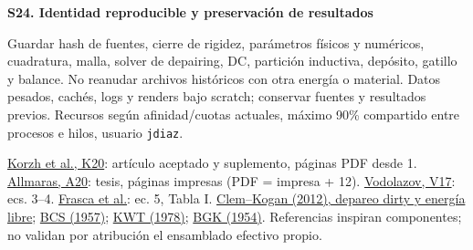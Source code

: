 \documentclass[11pt,a4paper]{article}
\newcommand{\block}[1]{\par\vspace{6pt}{\large\bfseries\color{ink}#1}\par\vspace{3pt}}
\newcommand{\assumption}[2]{\par\vspace{6pt}\hypertarget{#1}{\textbf{\color{ink}#1. #2}}\par}
\newcommand{\smallnote}[1]{{\small #1\par}}
\begin{document}
\assumption{S24}{Identidad reproducible y preservación de resultados}
\smallnote{Guardar hash de fuentes, cierre de rigidez, parámetros físicos y numéricos, cuadratura, malla, solver de depairing, DC, partición inductiva, depósito, gatillo y balance. No reanudar archivos históricos con otra energía o material. Datos pesados, cachés, logs y renders bajo scratch; conservar fuentes y resultados previos. Recursos según afinidad/cuotas actuales, máximo 90\% compartido entre procesos e hilos, usuario \texttt{jdiaz}.}
\block{Fuentes primarias}
\smallnote{\href{https://eprints.lancs.ac.uk/id/eprint/140252/3/Binder1.pdf}{Korzh et al., K20}: artículo aceptado y suplemento, páginas PDF desde 1.
\href{https://thesis.caltech.edu/13748/}{Allmaras, A20}: tesis, páginas impresas (PDF = impresa + 12).
\href{https://arxiv.org/abs/1611.06060}{Vodolazov, V17}: ecs. 3--4.
\href{https://arxiv.org/pdf/1904.08596}{Frasca et al.}: ec. 5, Tabla I.
\href{https://arxiv.org/html/1207.6421}{Clem--Kogan (2012), depareo dirty y energía libre}; \href{https://doi.org/10.1103/PhysRev.108.1175}{BCS (1957)};
\href{https://doi.org/10.1103/PhysRevLett.40.1041}{KWT (1978)};
\href{https://doi.org/10.1103/PhysRev.94.511}{BGK (1954)}.
Referencias inspiran componentes; no validan por atribución el ensamblado efectivo propio.}
\end{document}
